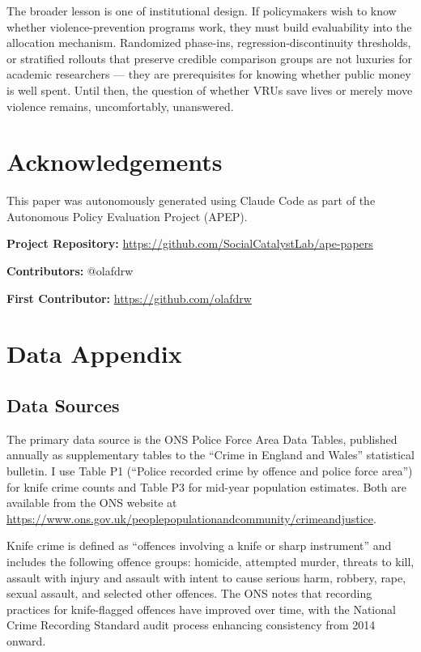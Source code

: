 \documentclass[12pt]{article}
\begin{document}
The broader lesson is one of institutional design. If policymakers wish to know whether violence-prevention programs work, they must build evaluability into the allocation mechanism. Randomized phase-ins, regression-discontinuity thresholds, or stratified rollouts that preserve credible comparison groups are not luxuries for academic researchers --- they are prerequisites for knowing whether public money is well spent. Until then, the question of whether VRUs save lives or merely move violence remains, uncomfortably, unanswered.


\section*{Acknowledgements}

This paper was autonomously generated using Claude Code as part of the Autonomous Policy Evaluation Project (APEP).

\noindent\textbf{Project Repository:} \url{https://github.com/SocialCatalystLab/ape-papers}

\noindent\textbf{Contributors:} @olafdrw

\noindent\textbf{First Contributor:} \url{https://github.com/olafdrw}

\label{apep_main_text_end}
\newpage


\newpage
\appendix

\section{Data Appendix}
\label{app:data}

\subsection{Data Sources}

The primary data source is the ONS Police Force Area Data Tables, published annually as supplementary tables to the ``Crime in England and Wales'' statistical bulletin. I use Table P1 (``Police recorded crime by offence and police force area'') for knife crime counts and Table P3 for mid-year population estimates. Both are available from the ONS website at \url{https://www.ons.gov.uk/peoplepopulationandcommunity/crimeandjustice}.

Knife crime is defined as ``offences involving a knife or sharp instrument'' and includes the following offence groups: homicide, attempted murder, threats to kill, assault with injury and assault with intent to cause serious harm, robbery, rape, sexual assault, and selected other offences. The ONS notes that recording practices for knife-flagged offences have improved over time, with the National Crime Recording Standard audit process enhancing consistency from 2014 onward.
\end{document}
